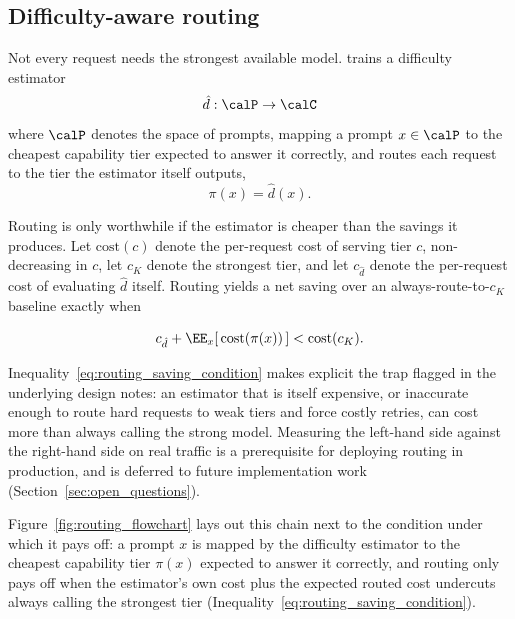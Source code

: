 \subsection{Difficulty-aware routing}
\label{sec:routing}

Not every request needs the strongest available model. \NoesisServer{}
trains a difficulty estimator
\begin{equation}
  \label{eq:difficulty_estimator}
  \hat d : \calP \to \calC
\end{equation}
where $\calP$ denotes the space of prompts, mapping a prompt $x \in \calP$
to the cheapest capability tier expected to
answer it correctly, and routes each request to the tier the estimator
itself outputs,
\begin{equation}
  \label{eq:routing_policy}
  \pi(x) = \hat d(x).
\end{equation}

Routing is only worthwhile if the estimator is cheaper than the savings it
produces. Let $\text{cost}(c)$ denote the per-request cost of serving tier
$c$, non-decreasing in $c$, let $c_K$ denote the strongest tier, and let
$c_{\hat d}$ denote the per-request cost of evaluating $\hat d$ itself.
Routing yields a net saving over an always-route-to-$c_K$ baseline exactly
when

\begin{equation}
  \label{eq:routing_saving_condition}
  c_{\hat d} + \EE_x [\, \text{cost}(\pi(x)) \,]
  <
  \text{cost}(c_K).
\end{equation}

Inequality~\eqref{eq:routing_saving_condition} makes explicit the trap
flagged in the underlying design notes: an estimator that is itself
expensive, or inaccurate enough to route hard requests to weak tiers and
force costly retries, can cost more than always calling the strong model.
Measuring the left-hand side against the right-hand side on real traffic
is a prerequisite for deploying routing in production, and is deferred to
future implementation work (Section~\ref{sec:open_questions}).

Figure~\ref{fig:routing_flowchart} lays out this chain next to the
condition under which it pays off: a prompt $x$ is mapped by the
difficulty estimator to the cheapest capability tier $\pi(x)$ expected to
answer it correctly, and routing only pays off when the estimator's own
cost plus the expected routed cost undercuts always calling the strongest
tier (Inequality~\eqref{eq:routing_saving_condition}).

